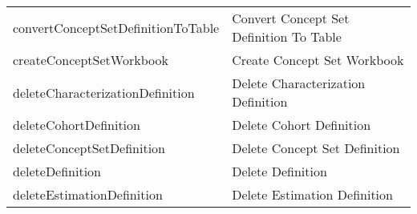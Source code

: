 \documentclass[
]{article}
\begin{document}
\begin{longtable}[]{@{}ll@{}}
\begin{minipage}[t]{0.46\columnwidth}\raggedright
convertConceptSetDefinitionToTable\strut
\end{minipage} & \begin{minipage}[t]{0.48\columnwidth}\raggedright
Convert Concept Set Definition To Table\strut
\end{minipage}\tabularnewline
\begin{minipage}[t]{0.46\columnwidth}\raggedright
createConceptSetWorkbook\strut
\end{minipage} & \begin{minipage}[t]{0.48\columnwidth}\raggedright
Create Concept Set Workbook\strut
\end{minipage}\tabularnewline
\begin{minipage}[t]{0.46\columnwidth}\raggedright
deleteCharacterizationDefinition\strut
\end{minipage} & \begin{minipage}[t]{0.48\columnwidth}\raggedright
Delete Characterization Definition\strut
\end{minipage}\tabularnewline
\begin{minipage}[t]{0.46\columnwidth}\raggedright
deleteCohortDefinition\strut
\end{minipage} & \begin{minipage}[t]{0.48\columnwidth}\raggedright
Delete Cohort Definition\strut
\end{minipage}\tabularnewline
\begin{minipage}[t]{0.46\columnwidth}\raggedright
deleteConceptSetDefinition\strut
\end{minipage} & \begin{minipage}[t]{0.48\columnwidth}\raggedright
Delete Concept Set Definition\strut
\end{minipage}\tabularnewline
\begin{minipage}[t]{0.46\columnwidth}\raggedright
deleteDefinition\strut
\end{minipage} & \begin{minipage}[t]{0.48\columnwidth}\raggedright
Delete Definition\strut
\end{minipage}\tabularnewline
\begin{minipage}[t]{0.46\columnwidth}\raggedright
deleteEstimationDefinition\strut
\end{minipage} & \begin{minipage}[t]{0.48\columnwidth}\raggedright
Delete Estimation Definition\strut
\end{minipage}\tabularnewline

\end{longtable}
\end{document}
